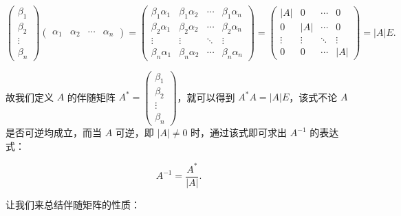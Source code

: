 \[
    \begin{pmatrix}
        \beta_1 \\ \beta_2 \\ \vdots \\ \beta_n
    \end{pmatrix} \begin{pmatrix}
        \alpha_1 & \alpha_2 & \cdots & \alpha_n
    \end{pmatrix} = \begin{pmatrix}
        \beta_1 \alpha_1 & \beta_1 \alpha_2 & \cdots & \beta_1 \alpha_n \\
        \beta_2 \alpha_1 & \beta_2 \alpha_2 & \cdots & \beta_2 \alpha_n \\
        \vdots & \vdots & \ddots & \vdots \\
        \beta_n \alpha_1 & \beta_n \alpha_2 & \cdots & \beta_n \alpha_n
    \end{pmatrix} = \begin{pmatrix}
        |A| & 0 & \cdots & 0 \\
        0 & |A| & \cdots & 0 \\
        \vdots & \vdots & \ddots & \vdots \\
        0 & 0 & \cdots & |A|
    \end{pmatrix} = |A| E.
\]

故我们定义 $A$ 的伴随矩阵 $A^* = \begin{pmatrix}
    \beta_1 \\ \beta_2 \\ \vdots \\ \beta_n
\end{pmatrix}$，就可以得到 $A^* A = |A| E$，该式不论 $A$ 是否可逆均成立，而当 $A$ 可逆，即 $|A| \neq 0$ 时，通过该式即可求出 $A^{-1}$ 的表达式：

\[
    A^{-1} = \frac{A^*}{|A|}.
\]

让我们来总结伴随矩阵的性质：

